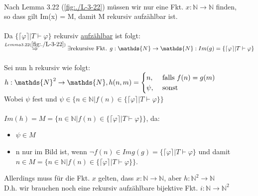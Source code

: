 \documentclass[a4paper]{scrartcl}%
\begin{document}
\begin{itemize}
\begin{itemize}
                    \\Nach Lemma 3.22 (\ref{fig:./L-3-22}) müssen wir nur eine Fkt. $x: \mathds{N} \rightarrow \mathds{N}$ finden,\\
                    so dass gilt Im(x) = M, damit M rekursiv aufzählbar ist.\\
                    \\Da $\{\lceil \varphi \rceil | T \vdash \varphi\}$ rekursiv \underline{aufzählbar} ist folgt:\\
                    $\overset{Lemma 3.22 (\ref{fig:./L-3-22})}{\Rightarrow} \exists \text{rekursive Fkt. } g: \mathds{N} \rightarrow \mathds{N}:
                    Im(g) = \{\lceil \varphi \rceil | T \vdash \varphi\}$\\
                    \\Sei nun h rekursiv wie folgt:\\
                    $h: \mathds{N}^2 \rightarrow \mathds{N},\\
                    h(n,m) = \begin{cases}
                        n, &\text{ falls }f(n) = g(m)\\
                        \psi, &\text{ sonst}\\
                    \end{cases}$\\
                    Wobei $\psi$ fest und $\psi \in \{n \in \mathds{N} | f(n) \in \{\lceil \varphi \rceil | T \vdash \varphi\}\}$\\
                    \\$Im(h) = M = \{n \in \mathds{N} | f(n) \in \{\lceil \varphi \rceil | T \vdash \varphi\}\}$, da:\\
                    \begin{itemize}
                        \item $\psi \in M$\\
                        \item n nur im Bild ist, wenn $\neg f(n) \in Img(g) = \{\lceil \varphi \rceil | T \vdash \varphi\}$ und damit
                    $n \in M = \{n \in \mathds{N} | f(n) \in \{\lceil \varphi \rceil | T \vdash \varphi\}\}$.\\
                    \end{itemize}
                    Allerdings muss für die Fkt. $x$ gelten, dass $x: \mathds{N} \rightarrow \mathds{N}$, aber $h: \mathds{N}^2 \rightarrow \mathds{N}$\\
                    D.h. wir brauchen noch eine rekursiv aufzählbare bijektive Fkt. $i: \mathds{N} \rightarrow \mathds{N}^2$\\

\end{itemize}
\end{itemize}
\end{document}
